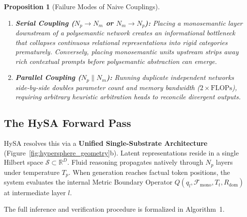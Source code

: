 \documentclass[10pt,twocolumn]{article}
\newtheorem{proposition}{Proposition}
\theoremstyle{definition}
\begin{document}
\begin{proposition}[Failure Modes of Naive Couplings]
\leavevmode
\begin{enumerate}[leftmargin=*, itemsep=2.0pt]
    \item \textbf{Serial Coupling ($N_p \to N_m$ or $N_m \to N_p$):} Placing a monosemantic layer downstream of a polysemantic network creates an informational bottleneck that collapses continuous relational representations into rigid categories prematurely. Conversely, placing monosemantic units upstream strips away rich contextual prompts before polysemantic abstraction can emerge.
    \item \textbf{Parallel Coupling ($N_p \parallel N_m$):} Running duplicate independent networks side-by-side doubles parameter count and memory bandwidth ($2\times \mathrm{FLOPs}$), requiring arbitrary heuristic arbitration heads to reconcile divergent outputs.
\end{enumerate}
\end{proposition}

\subsection{The HySA Forward Pass}
HySA resolves this via a \textbf{Unified Single-Substrate Architecture} (Figure~\ref{fig:hypersphere_geometry}b). Latent representations reside in a single Hilbert space $\mathcal{S} \subset \mathbb{R}^D$. Fluid reasoning propagates natively through $N_p$ layers under temperature $T_p$. When generation reaches factual token positions, the system evaluates the internal Metric Boundary Operator $Q(q_l, \mathcal{F}_{\mathrm{mono}}, T_t, R_{\mathrm{dom}})$ at intermediate layer $l$.

The full inference and verification procedure is formalized in Algorithm~1.
\end{document}
